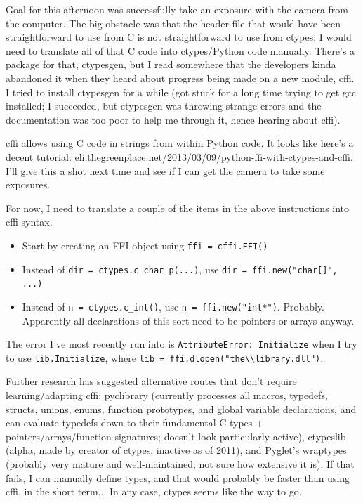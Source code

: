 \documentclass[11pt]{labbook}
\begin{document}
Goal for this afternoon was successfully take an exposure with the camera from the computer. The big obstacle was that the header file that would have been straightforward to use from C is not straightforward to use from ctypes; I would need to translate all of that C code into ctypes/Python code manually. There's a package for that, ctypesgen, but I read somewhere that the developers kinda abandoned it when they heard about progress being made on a new module, cffi. I tried to install ctypesgen for a while (got stuck for a long time trying to get gcc installed; I succeeded, but ctypesgen was throwing strange errors and the documentation was too poor to help me through it, hence hearing about cffi).

cffi allows using C code in strings from within Python code. It looks like here's a decent tutorial: \url{eli.thegreenplace.net/2013/03/09/python-ffi-with-ctypes-and-cffi}. I'll give this a shot next time and see if I can get the camera to take some exposures.

For now, I need to translate a couple of the items in the above instructions into cffi syntax.
\begin{itemize}
\item Start by creating an FFI object using \verb'ffi = cffi.FFI()'
\item Instead of \verb'dir = ctypes.c_char_p(...)', use \verb'dir = ffi.new("char[]", ...)'
\item Instead of \verb'n = ctypes.c_int()', use \verb'n = ffi.new("int*")'. Probably. Apparently all declarations of this sort need to be pointers or arrays anyway.
\end{itemize}

The error I've most recently run into is \verb'AttributeError: Initialize' when I try to use \verb'lib.Initialize', where \verb'lib = ffi.dlopen("the\\library.dll")'.

Further research has suggested alternative routes that don't require learning/adapting cffi: pyclibrary (currently processes all macros, typedefs, structs, unions, enums, function prototypes, and global variable declarations, and can evaluate typedefs down to their fundamental C types + pointers/arrays/function signatures; doesn't look particularly active), ctypeslib (alpha, made by creator of ctypes, inactive as of 2011), and Pyglet's wraptypes (probably very mature and well-maintained; not sure how extensive it is). If that fails, I can manually define types, and that would probably be faster than using cffi, in the short term... In any case, ctypes seems like the way to go.
\end{document}
